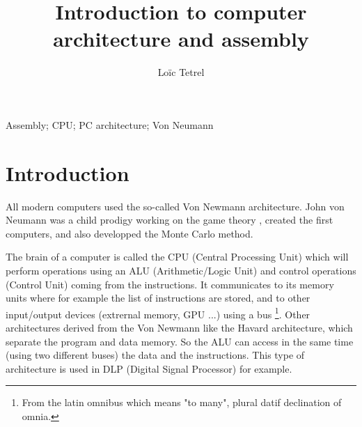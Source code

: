\documentclass[runningheads,a4paper]{llncs}
\newcommand{\keywords}[1]{\par\addvspace\baselineskip
	\noindent\keywordname\enspace\ignorespaces#1}
\begin{document}
	
	\mainmatter  %
	
	\title{Introduction to computer architecture and assembly}
	
	
	\author{Loïc Tetrel}
	
	\institute{}
	
	
	
	\maketitle

	\keywords{Assembly; CPU; PC architecture;  Von Neumann}

	\section{Introduction}\label{introduction}
	All modern computers used the so-called Von Newmann architecture. John von Neumann was a child prodigy working on the game theory \cite{von2007theory}, created the first computers, and also developped the Monte Carlo method.
	\par
	The brain of a computer is called the CPU (Central Processing Unit) which will perform operations using an ALU (Arithmetic/Logic Unit) and control operations (Control Unit) coming from the instructions. It communicates to its memory units where for example the list of instructions are stored, and to other input/output devices (extrernal memory, GPU ...) using a bus \footnote{From the latin omnibus which means "to many", plural datif declination of omnia.}. Other architectures derived from the Von Newmann like the Havard architecture, which separate the program and data memory. So the ALU can access in the same time (using two different buses) the data and the instructions. This type of architecture is used in DLP (Digital Signal Processor) for example.
	
\end{document}
